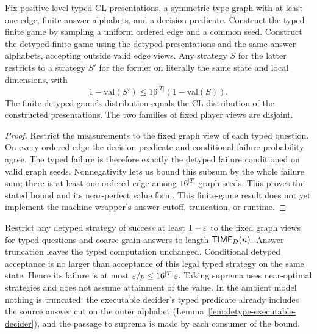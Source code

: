 \begin{lemma}
\label{lem:detype-game-soundness}
\leanok
Fix positive-level typed CL presentations, a symmetric type graph with at
least one edge, finite answer alphabets, and a decision predicate. Construct
the typed finite game by sampling a uniform ordered edge and a common seed.
Construct the detyped finite game using the detyped presentations and the
same answer alphabets, accepting outside valid edge views. Any strategy $S$
for the latter restricts to a strategy $S'$ for the former on literally
the same state and local dimensions, with
\[
  1-\mathrm{val}(S')\leq16^{|T|}(1-\mathrm{val}(S)).
\]
The finite detyped game's distribution equals the CL distribution of the
constructed presentations. The two families of fixed player views are
disjoint.
\end{lemma}
\begin{proof}
\leanok
Restrict the measurements to the fixed graph view of each typed question.
On every ordered edge the decision predicate and conditional failure
probability agree. The typed failure is therefore exactly the detyped
failure conditioned on valid graph seeds. Nonnegativity lets us bound this
subsum by the whole failure sum; there is at least one ordered edge among
$16^{|T|}$ graph seeds. This proves the stated bound and its near-perfect
value form. This finite-game result does not yet implement the machine
wrapper's answer cutoff, truncation, or runtime.
\end{proof}

\begin{lemma}
\label{lem:detype-soundness}
\leanok
Restrict any detyped strategy of success at least $1-\varepsilon$ to the fixed
graph views for typed questions and coarse-grain answers to length
$\mathsf{TIME}_D(n)$. Answer truncation leaves the typed computation unchanged.
Conditional detyped acceptance is no larger than acceptance of this legal
typed strategy on the same state. Hence its failure is at most
$\varepsilon/p\leq16^{|T|}\varepsilon$. Taking suprema uses near-optimal strategies and
does not assume attainment of the value.
In the ambient model nothing is truncated: the executable decider's typed predicate already
includes the source answer cut on the outer alphabet
(Lemma~\ref{lem:detype-executable-decider}), and the passage to suprema is made by each
consumer of the bound.
\end{lemma}

